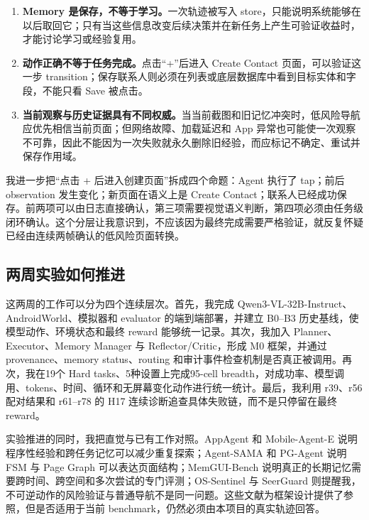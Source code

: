 \documentclass[12pt,a4paper]{ctexart}
\begin{document}
\begin{enumerate}[leftmargin=2em]
    \item \textbf{Memory 是保存，不等于学习。}一次轨迹被写入 store，只能说明系统能够在以后取回它；只有当这些信息改变后续决策并在新任务上产生可验证收益时，才能讨论学习或经验复用。
    \item \textbf{动作正确不等于任务完成。}点击“+”后进入 Create Contact 页面，可以验证这一步 transition；保存联系人则必须在列表或底层数据库中看到目标实体和字段，不能只看 Save 被点击。
    \item \textbf{当前观察与历史证据具有不同权威。}当当前截图和旧记忆冲突时，低风险导航应优先相信当前页面；但网络故障、加载延迟和 App 异常也可能使一次观察不可靠，因此不能因为一次失败就永久删除旧经验，而应标记不确定、重试并保存作用域。
\end{enumerate}

我进一步把“点击 + 后进入创建页面”拆成四个命题：Agent 执行了 tap；前后 observation 发生变化；新页面在语义上是 Create Contact；联系人已经成功保存。前两项可以由日志直接确认，第三项需要视觉语义判断，第四项必须由任务级闭环确认。这个分层让我意识到，不应该因为最终完成需要严格验证，就反复怀疑已经由连续两帧确认的低风险页面转换。

\subsection{两周实验如何推进}

这两周的工作可以分为四个连续层次。首先，我完成 Qwen3-VL-32B-Instruct、AndroidWorld、模拟器和 evaluator 的端到端部署，并建立 B0--B3 历史基线，使模型动作、环境状态和最终 reward 能够统一记录。其次，我加入 Planner、Executor、Memory Manager 与 Reflector/Critic，形成 M0 框架，并通过 provenance、memory status、routing 和审计事件检查机制是否真正被调用。再次，我在19个 Hard tasks、5种设置上完成95-cell breadth，对成功率、模型调用、tokens、时间、循环和无屏幕变化动作进行统一统计。最后，我利用 r39、r56 配对结果和 r61--r78 的 H17 连续诊断追查具体失败链，而不是只停留在最终 reward。

实验推进的同时，我把直觉与已有工作对照。AppAgent 和 Mobile-Agent-E 说明程序性经验和跨任务记忆可以减少重复探索\cite{appagent,mobileagente}；Agent-SAMA 和 PG-Agent 说明 FSM 与 Page Graph 可以表达页面结构\cite{agentsama,pgagent}；MemGUI-Bench 说明真正的长期记忆需要跨时间、跨空间和多次尝试的专门评测\cite{memgui}；OS-Sentinel 与 SeerGuard 则提醒我，不可逆动作的风险验证与普通导航不是同一问题\cite{ossentinel,seerguard}。这些文献为框架设计提供了参照，但是否适用于当前 benchmark，仍然必须由本项目的真实轨迹回答。
\end{document}
